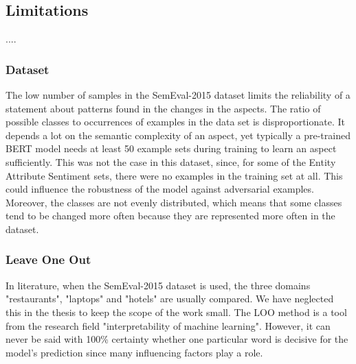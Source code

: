 \subsection{Limitations}
....

\subsubsection{Dataset}
The low number of samples in the SemEval-2015 dataset limits the reliability of a statement about patterns found in the changes in the aspects. The ratio of possible classes to occurrences of examples in the data set is disproportionate. It depends a lot on the semantic complexity of an aspect, yet typically a pre-trained BERT model needs at least 50 example sets during training to learn an aspect sufficiently. This was not the case in this dataset, since, for some of the Entity Attribute Sentiment sets, there were no examples in the training set at all. This could influence the robustness of the model against adversarial examples.
Moreover, the classes are not evenly distributed, which means that some classes tend to be changed more often because they are represented more often in the dataset. 
\subsubsection{Leave One Out}
In literature, when the SemEval-2015 dataset is used, the three domains "restaurants", "laptops" and "hotels" are usually compared. We have neglected this in the thesis to keep the scope of the work small.
The LOO method is a tool from the research field "interpretability of machine learning". However, it can never be said with 100\% certainty whether one particular word is decisive for the model's prediction since many influencing factors play a role.



